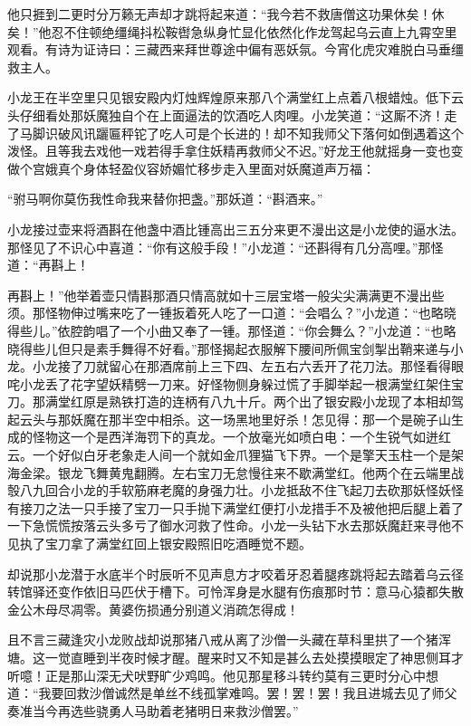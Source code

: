 \documentclass[12pt,UTF8]{ctexbook}
\begin{document}
他只捱到二更时分万籁无声却才跳将起来道：“我今若不救唐僧这功果休矣！休矣！”他忍不住顿绝缰绳抖松鞍辔急纵身忙显化依然化作龙驾起乌云直上九霄空里观看。有诗为证诗曰：三藏西来拜世尊途中偏有恶妖氛。今宵化虎灾难脱白马垂缰救主人。

小龙王在半空里只见银安殿内灯烛辉煌原来那八个满堂红上点着八根蜡烛。低下云头仔细看处那妖魔独自个在上面逼法的饮酒吃人肉哩。小龙笑道：“这厮不济！走了马脚识破风讯躧匾秤铊了吃人可是个长进的！却不知我师父下落何如倒遇着这个泼怪。且等我去戏他一戏若得手拿住妖精再救师父不迟。”好龙王他就摇身一变也变做个宫娥真个身体轻盈仪容娇媚忙移步走入里面对妖魔道声万福：

“驸马啊你莫伤我性命我来替你把盏。”那妖道：“斟酒来。”

小龙接过壶来将酒斟在他盏中酒比锺高出三五分来更不漫出这是小龙使的逼水法。那怪见了不识心中喜道：“你有这般手段！”小龙道：“还斟得有几分高哩。”那怪道：“再斟上！

再斟上！”他举着壶只情斟那酒只情高就如十三层宝塔一般尖尖满满更不漫出些须。那怪物伸过嘴来吃了一锺扳着死人吃了一口道：“会唱么？”小龙道：“也略晓得些儿。”依腔韵唱了一个小曲又奉了一锺。那怪道：“你会舞么？”小龙道：“也略晓得些儿但只是素手舞得不好看。”那怪揭起衣服解下腰间所佩宝剑掣出鞘来递与小龙。小龙接了刀就留心在那酒席前上三下四、左五右六丢开了花刀法。那怪看得眼咤小龙丢了花字望妖精劈一刀来。好怪物侧身躲过慌了手脚举起一根满堂红架住宝刀。那满堂红原是熟铁打造的连柄有八九十斤。两个出了银安殿小龙现了本相却驾起云头与那妖魔在那半空中相杀。这一场黑地里好杀！怎见得：那一个是碗子山生成的怪物这一个是西洋海罚下的真龙。一个放毫光如喷白电：一个生锐气如迸红云。一个好似白牙老象走人间一个就如金爪狸猫飞下界。一个是擎天玉柱一个是架海金梁。银龙飞舞黄鬼翻腾。左右宝刀无怠慢往来不歇满堂红。他两个在云端里战彀八九回合小龙的手软筋麻老魔的身强力壮。小龙抵敌不住飞起刀去砍那妖怪妖怪有接刀之法一只手接了宝刀一只手抛下满堂红便打小龙措手不及被他把后腿上着了一下急慌慌按落云头多亏了御水河救了性命。小龙一头钻下水去那妖魔赶来寻他不见执了宝刀拿了满堂红回上银安殿照旧吃酒睡觉不题。

却说那小龙潜于水底半个时辰听不见声息方才咬着牙忍着腿疼跳将起去踏着乌云径转馆驿还变作依旧马匹伏于槽下。可怜浑身是水腿有伤痕那时节：意马心猿都失散金公木母尽凋零。黄婆伤损通分别道义消疏怎得成！

且不言三藏逢灾小龙败战却说那猪八戒从离了沙僧一头藏在草科里拱了一个猪浑塘。这一觉直睡到半夜时候才醒。醒来时又不知是甚么去处摸摸眼定了神思侧耳才听噫！正是那山深无犬吠野旷少鸡鸣。他见那星移斗转约莫有三更时分心中想道：“我要回救沙僧诚然是单丝不线孤掌难鸣。罢！罢！罢！我且进城去见了师父奏准当今再选些骁勇人马助着老猪明日来救沙僧罢。”
\end{document}
